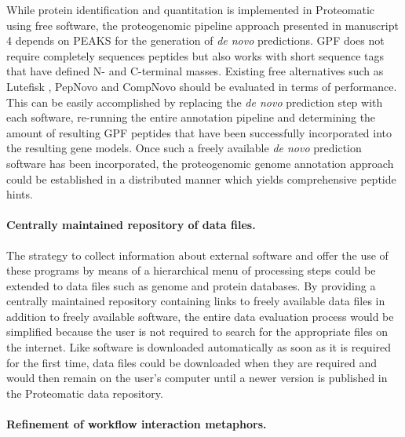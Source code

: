 While protein identification and quantitation is implemented in Proteomatic
using free software, the proteogenomic pipeline approach presented in 
manuscript 4 depends on PEAKS for the generation of {\em de novo} predictions.
GPF does not require completely sequences peptides but also works with
short sequence tags that have defined N- and C-terminal masses.
Existing free alternatives such as Lutefisk \citep{Johnson2002}, PepNovo 
\citep{Frank2005} and CompNovo \citep{Bertsch2009} should be evaluated in
terms of performance.
This can be easily accomplished by replacing the {\em de novo} prediction
step with each software, re-running the entire annotation pipeline and 
determining the amount of resulting GPF peptides that have been successfully
incorporated into the resulting gene models.
Once such a freely available {\em de novo} prediction software has been
incorporated, the proteogenomic genome annotation approach could be 
established in a distributed manner which yields comprehensive peptide hints.

\paragraph{Centrally maintained repository of data files.}

The strategy to collect information about external software and offer the
use of these programs by means of a hierarchical menu of processing steps
could be extended to data files such as genome and protein databases.
By providing a centrally maintained repository containing links to freely
available data files in addition to freely available software, the entire
data evaluation process would be simplified because the user is not
required to search for the appropriate files on the internet.
Like software is downloaded automatically as soon as it is required for the 
first time, data files could be downloaded when they are required and would
then remain on the user's computer until a newer version is published in
the Proteomatic data repository.

\paragraph{Refinement of workflow interaction metaphors.}

